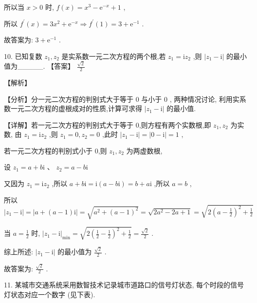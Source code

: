 \documentclass[10pt]{article}
\begin{document}
所以当 \(x > 0\) 时, \(f\left( x\right)  = {x}^{3} - {\mathrm{e}}^{-x} + 1\) ,

所以 \({f}^{\prime }\left( x\right)  = 3{x}^{2} + {\mathrm{e}}^{-x} \Rightarrow  {f}^{\prime }\left( 1\right)  = 3 + {\mathrm{e}}^{-1}\) .

故答案为: \(3 + {\mathrm{e}}^{-1}\) .

10. 已知复数 \({z}_{1},{z}_{2}\) 是实系数一元二次方程的两个根,若 \({z}_{1} = \mathrm{i}{z}_{2}\) ,则 \(\left| {{z}_{1} - \mathrm{i}}\right|\) 的最小值为\_\_\_\_\_. 【答案】 \(\frac{\sqrt{2}}{2}\)

【解析】

【分析】分一元二次方程的判别式大于等于 0 与小于 0 , 两种情况讨论, 利用实系数一元二次方程的虚根成对的性质,计算可求得 \(\left| {{z}_{1} - \mathrm{i}}\right|\) 的最小值.

【详解】若一元二次方程的判别式大于等于 0,则方程有两个实数根,即 \({z}_{1},{z}_{2}\) 为实数, 由 \({z}_{1} = \mathrm{i}{z}_{2}\) ,则 \({z}_{1} = 0,{z}_{2} = 0\) ,此时 \(\left| {{z}_{1} - \mathrm{i}}\right|  = \left| {0 - \mathrm{i}}\right|  = 1\) ,

若一元二次方程的判别式小于 0,则 \({z}_{1},{z}_{2}\) 为两虚数根,

设 \({z}_{1} = a + b\mathrm{i}\text{ 、 }{z}_{2} = a - b\mathrm{i}\)

又因为 \({z}_{1} = \mathrm{i}{z}_{2}\) ,所以 \(a + b\mathrm{i} = \mathrm{i}\left( {a - b\mathrm{i}}\right)  = b + a\mathrm{i}\) ,所以 \(a = b\) ,

所以 \(\left| {{z}_{1} - \mathrm{i}}\right|  = \left| {a + \left( {a - 1}\right) \mathrm{i}}\right|  = \sqrt{{a}^{2} + {\left( a - 1\right) }^{2}} = \sqrt{2{a}^{2} - {2a} + 1} = \sqrt{2{\left( a - \frac{1}{2}\right) }^{2} + \frac{1}{2}}\)

当 \(a = \frac{1}{2}\) 时, \({\left| {z}_{1} - \mathrm{i}\right| }_{\min } = \sqrt{2{\left( \frac{1}{2} - \frac{1}{2}\right) }^{2} + \frac{1}{2}} = \frac{\sqrt{2}}{2}\) .

综上所述: \(\left| {{z}_{1} - \mathrm{i}}\right|\) 的最小值为 \(\frac{\sqrt{2}}{2}\) .

故答案为: \(\frac{\sqrt{2}}{2}\) .

11. 某城市交通系统采用数智技术记录城市道路口的信号灯状态, 每个时段的信号灯状态对应一个数字 (见下表).

\begin{center}
\end{center}
\end{document}
